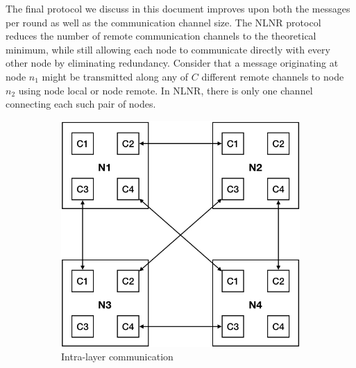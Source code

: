 \documentclass[10]{report}
\begin{document}
The final protocol we discuss in this document improves upon both the messages per round as well as the communication channel size.
The NLNR protocol reduces the number of remote communication channels to the theoretical minimum, while still allowing each node to communicate directly with every other node by eliminating redundancy.
Consider that a message originating at node $n_1$ might be transmitted along any of $C$ different remote channels to node $n_2$ using node local or node remote.
In NLNR, there is only one channel connecting each such pair of nodes. 

\begin{figure}
	\begin{center}
		\begin{subfigure}{0.45\linewidth}
			\centerline{\includegraphics[width=1.0\columnwidth]{intra_layer_nlnr}}
			\caption{Intra-layer communication \label{fig:intra_exchange}}
		\end{subfigure}%
		\hspace{1em}%
		\begin{subfigure}{0.49\linewidth}

\end{subfigure}
\end{center}
\end{figure}
\end{document}
